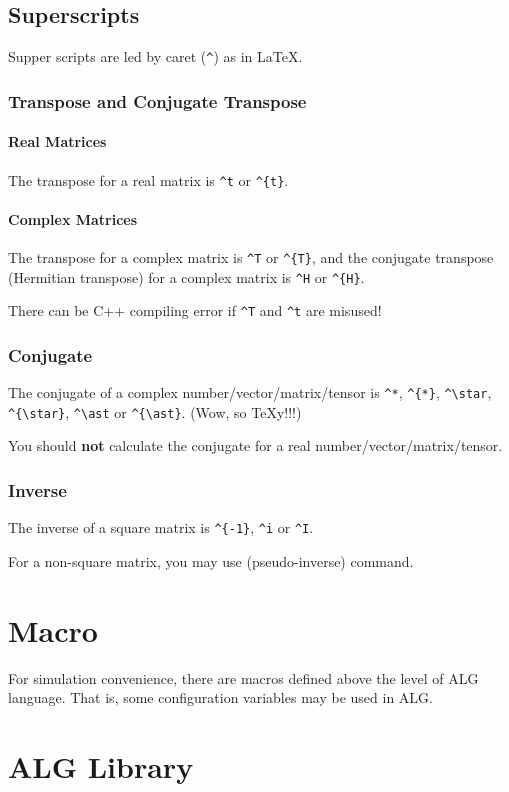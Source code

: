\subsection{Superscripts}\label{d:subsec:CALC_super}
Supper scripts are led by caret (\verb`^`\indextt{\^{}}) as in \LaTeX{}.
\subsubsection{Transpose and Conjugate Transpose}
\paragraph{Real Matrices}
The transpose for a real matrix is \verb`^t` or \verb`^{t}`.
\paragraph{Complex Matrices}
The transpose for a complex matrix is \verb`^T` or \verb`^{T}`,
and the conjugate transpose (Hermitian transpose)
for a complex matrix is \verb`^H` or \verb`^{H}`.
\begin{warning}
  There can be C++ compiling error if \verb`^T` and \verb`^t` are misused!
\end{warning}
\subsubsection{Conjugate}
The conjugate of a complex number/vector/matrix/tensor is
\verb`^*`\indextt{\^{}*},
\verb`^{*}`\indextt{\^{}\{*\}},
\verb`^\star`,
\verb`^{\star}`,
\verb`^\ast` or
\verb`^{\ast}`.
(Wow, so \TeX y!!!)
\begin{warning}
  You should \textbf{not} calculate the conjugate for a real number/vector/matrix/tensor.
\end{warning}
\subsubsection{Inverse}
The inverse of a square matrix is
\verb`^{-1}`,
\verb`^i` or
\verb`^I`.

For a non-square matrix, you may use
\ALG{\pinv} (pseudo-inverse) command.

\section{Macro}\label{d:sec:macro}
For simulation convenience,
there are macros defined above the level of ALG language.
That is, some configuration variables may be used in ALG.

\section{ALG Library}\label{d:sec:alg_lib}
